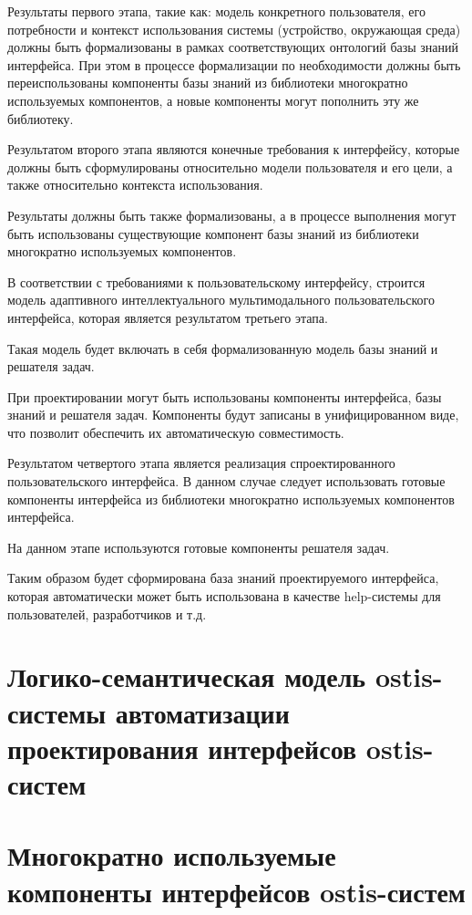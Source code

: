 
Результаты первого этапа, такие как: модель конкретного пользователя, его потребности и контекст использования системы (устройство, окружающая среда) должны быть формализованы в рамках соответствующих онтологий базы знаний интерфейса. 
При этом в процессе формализации по необходимости должны быть переиспользованы компоненты базы знаний из библиотеки многократно используемых компонентов, а новые компоненты могут пополнить эту же библиотеку.


Результатом второго этапа являются конечные требования к интерфейсу, которые должны быть сформулированы относительно модели пользователя и его цели, а также относительно контекста использования.

Результаты должны быть также формализованы, а в процессе выполнения могут быть использованы существующие компонент базы знаний из библиотеки многократно используемых компонентов.


В соответствии с требованиями к пользовательскому интерфейсу, строится модель адаптивного интеллектуального мультимодального пользовательского интерфейса, которая является результатом третьего этапа.

Такая модель будет включать в себя формализованную модель базы знаний и решателя задач.

При проектировании могут быть использованы компоненты интерфейса, базы знаний и решателя задач. 
Компоненты будут записаны в унифицированном виде, что позволит обеспечить их автоматическую совместимость.


Результатом четвертого этапа является реализация спроектированного пользовательского интерфейса. В данном случае следует использовать готовые компоненты интерфейса из библиотеки многократно используемых компонентов интерфейса.

На данном этапе используются готовые компоненты решателя задач.


Таким образом будет сформирована база знаний проектируемого интерфейса, которая автоматически может быть использована в качестве help-системы для пользователей, разработчиков и т.д.



\section{Логико-семантическая модель ostis-системы автоматизации проектирования интерфейсов ostis-систем}
\section{Многократно используемые компоненты интерфейсов ostis-систем}

%